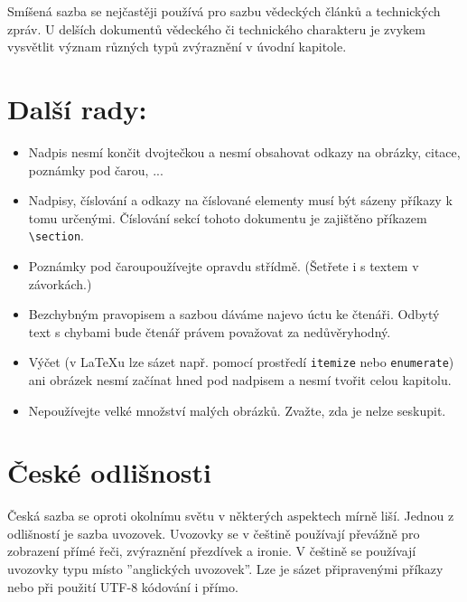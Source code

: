 \documentclass[10pt]{article}[25.2.2024]
\begin{document}
\begin{multicols}{2}
Smíšená sazba se nejčastěji používá pro sazbu vědeckých článků a technických zpráv.
U delších dokumentů vědeckého či technického charakteru je zvykem vysvětlit význam různých typů zvýraznění v úvodní kapitole.


\section{Další rady:}
\begin{itemize}[itemsep=2pt]
    \item Nadpis nesmí končit dvojtečkou a nesmí obsahovat odkazy na obrázky, citace, poznámky pod čarou, ...
    \item Nadpisy, číslování a odkazy na číslované elementy musí být sázeny příkazy k tomu určenými. Číslování sekcí tohoto dokumentu je zajištěno příkazem \verb|\section|.

    \item Poznámky pod čarou\footnotemark[1] používejte opravdu střídmě. (Šetřete i s textem v závorkách.)

    \item Bezchybným pravopisem a sazbou dáváme najevo úctu ke čtenáři. Odbytý text s chybami bude čtenář právem považovat za nedůvěryhodný.

    \item Výčet (v \LaTeX u lze sázet např. pomocí prostředí \texttt{itemize} nebo \texttt{enumerate}) ani obrázek nesmí začínat hned pod nadpisem a nesmí tvořit celou kapitolu.

    \item Nepoužívejte velké množství malých obrázků. Zvažte, zda je nelze seskupit.
\end{itemize}






\section{České odlišnosti}
Česká sazba se oproti okolnímu světu v některých aspektech mírně liší.
Jednou z odlišností je sazba uvozovek.
Uvozovky se v češtině používají převážně pro zobrazení přímé řeči, zvýraznění přezdívek a ironie.
V češtině se používají uvozovky typu  místo ''anglických uvozovek''.
Lze je sázet připravenými příkazy nebo při použití UTF-8 kódování i přímo.


\end{multicols}
\end{document}
